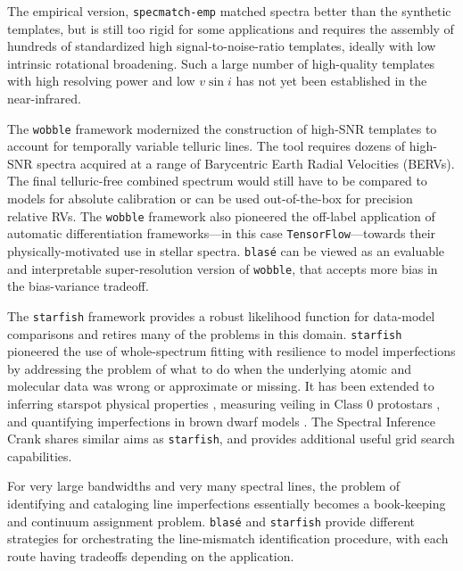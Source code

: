 \documentclass[modern]{aastex631}
\begin{document}
The empirical version, \texttt{specmatch-emp} \citep{2017ApJ...836...77Y} matched spectra better than the synthetic templates, but is still too rigid for some applications and requires the assembly of hundreds of standardized high signal-to-noise-ratio templates, ideally with low intrinsic rotational broadening.  Such a large number of high-quality templates with high resolving power and low $v\sin{i}$ has not yet been established in the near-infrared.

The \texttt{wobble} framework \citep{2019AJ....158..164B} modernized the construction of high-SNR templates to account for temporally variable telluric lines. The tool requires dozens of high-SNR spectra acquired at a range of Barycentric Earth Radial Velocities (BERVs).  The final telluric-free combined spectrum would still have to be compared to models for absolute calibration or can be used out-of-the-box for precision relative RVs.  The \texttt{wobble} framework also pioneered the off-label application of automatic differentiation frameworks---in this case \texttt{TensorFlow}---towards their physically-motivated use in stellar spectra.  \texttt{blas\'e} can be viewed as an evaluable and interpretable super-resolution version of \texttt{wobble}, that accepts more bias in the bias-variance tradeoff.

The \texttt{starfish} framework \citep{czekala15} provides a robust likelihood function for data-model comparisons and retires many of the problems in this domain.  \texttt{starfish} pioneered the use of whole-spectrum fitting with resilience to model imperfections by addressing the problem of what to do when the underlying atomic and molecular data was wrong or approximate or missing.  It has been extended to inferring starspot physical properties \citep{2017ApJ...836..200G}, measuring veiling in Class 0 protostars \citep{2018ApJ...862...85G}, and quantifying imperfections in brown dwarf models \citep{2021ApJ...921...95Z}.  The Spectral Inference Crank \citep[\texttt{sick},][]{2016ApJS..223....8C} shares similar aims as \texttt{starfish}, and provides additional useful grid search capabilities.

For very large bandwidths and very many spectral lines, the problem of identifying and cataloging line imperfections essentially becomes a book-keeping and continuum assignment problem.  \texttt{blas\'e} and \texttt{starfish} provide different strategies for orchestrating the line-mismatch identification procedure, with each route having tradeoffs depending on the application.
\end{document}
